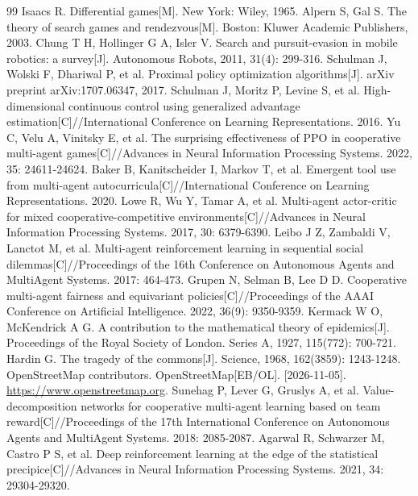 \documentclass[a4paper,zihao=5,fontset=fandol,UTF8]{ctexart}
\begin{document}
\renewcommand{\refname}{\normalsize\normalfont 参考文献：}
\begin{thebibliography}{99}
\small
\setlength{\itemsep}{0pt}
 Isaacs R. Differential games[M]. New York: Wiley, 1965.
 Alpern S, Gal S. The theory of search games and rendezvous[M]. Boston: Kluwer Academic Publishers, 2003.
 Chung T H, Hollinger G A, Isler V. Search and pursuit-evasion in mobile robotics: a survey[J]. Autonomous Robots, 2011, 31(4): 299-316.
 Schulman J, Wolski F, Dhariwal P, et al. Proximal policy optimization algorithms[J]. arXiv preprint arXiv:1707.06347, 2017.
 Schulman J, Moritz P, Levine S, et al. High-dimensional continuous control using generalized advantage estimation[C]//International Conference on Learning Representations. 2016.
 Yu C, Velu A, Vinitsky E, et al. The surprising effectiveness of PPO in cooperative multi-agent games[C]//Advances in Neural Information Processing Systems. 2022, 35: 24611-24624.
 Baker B, Kanitscheider I, Markov T, et al. Emergent tool use from multi-agent autocurricula[C]//International Conference on Learning Representations. 2020.
 Lowe R, Wu Y, Tamar A, et al. Multi-agent actor-critic for mixed cooperative-competitive environments[C]//Advances in Neural Information Processing Systems. 2017, 30: 6379-6390.
 Leibo J Z, Zambaldi V, Lanctot M, et al. Multi-agent reinforcement learning in sequential social dilemmas[C]//Proceedings of the 16th Conference on Autonomous Agents and MultiAgent Systems. 2017: 464-473.
 Grupen N, Selman B, Lee D D. Cooperative multi-agent fairness and equivariant policies[C]//Proceedings of the AAAI Conference on Artificial Intelligence. 2022, 36(9): 9350-9359.
 Kermack W O, McKendrick A G. A contribution to the mathematical theory of epidemics[J]. Proceedings of the Royal Society of London. Series A, 1927, 115(772): 700-721.
 Hardin G. The tragedy of the commons[J]. Science, 1968, 162(3859): 1243-1248.
 OpenStreetMap contributors. OpenStreetMap[EB/OL]. [2026-11-05]. \url{https://www.openstreetmap.org}.
 Sunehag P, Lever G, Gruslys A, et al. Value-decomposition networks for cooperative multi-agent learning based on team reward[C]//Proceedings of the 17th International Conference on Autonomous Agents and MultiAgent Systems. 2018: 2085-2087.
 Agarwal R, Schwarzer M, Castro P S, et al. Deep reinforcement learning at the edge of the statistical precipice[C]//Advances in Neural Information Processing Systems. 2021, 34: 29304-29320.
\end{thebibliography}
\end{document}
